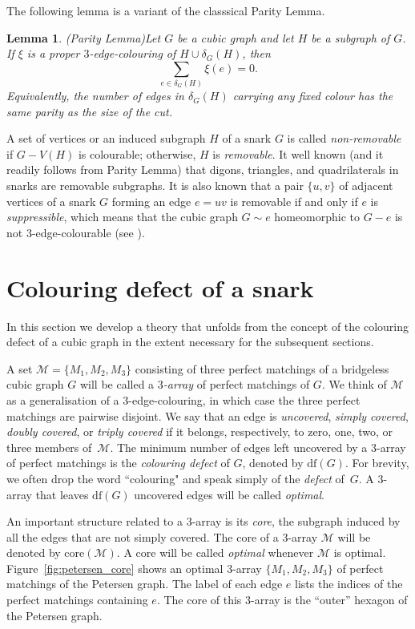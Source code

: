 \documentclass[a4paper]{amsart}
\newcommand{\df}[1]{\ensuremath{\mathrm{df}({#1})}\xspace}
\newcommand{\core}{{\mathrm{core}}}
\theoremstyle{plain}
\newtheorem{lemma}[theorem]{Lemma}
\theoremstyle{definition}
\begin{document}
The following lemma is a variant of the classsical Parity Lemma.

\begin{lemma}{\rm (Parity Lemma)}\label{lem:par}
Let $G$ be a cubic graph and let $H$ be a subgraph of $G$. If 
$\xi$ is a proper $3$-edge-colouring of $H\cup\delta_G(H)$, then
$$\sum_{e\in\delta_G(H)}\xi(e)=0.$$
Equivalently, the number of edges in $\delta_G(H)$ carrying any
fixed colour has the same parity as the size of the cut.
\end{lemma}

A set of vertices or an induced subgraph $H$ of a snark $G$ is
called \emph{non-removable} if $G - V(H)$ is colourable;
otherwise, $H$ is \emph{removable}. It well known (and it
readily follows from Parity Lemma) that digons, triangles, and
quadrilaterals in snarks are removable subgraphs. It is also
known that a pair $\{u,v\}$ of adjacent vertices of a snark $G$
forming an edge $e=uv$ is removable if and only if $e$ is
\emph{suppressible}, which means that the cubic graph $G\sim e$
homeomorphic to $G-e$ is not $3$-edge-colourable (see
\cite[Proposition~4.2]{NS-decred}).


\section{Colouring defect of a snark}\label{sec:arrays}

\noindent{}In this section we develop a theory that unfolds
from the concept of the colouring defect of a cubic graph in
the extent necessary for the subsequent sections.

A set $\mathcal{M}=\{M_1,M_2, M_3\}$ consisting of three
perfect matchings of a bridgeless cubic graph $G$ will be
called a \emph{$3$-array} of perfect matchings of $G$. We think
of $\mathcal{M}$ as a generalisation of a $3$-edge-colouring,
in which case the three perfect matchings are pairwise
disjoint. We say that an edge is \emph{uncovered}, \emph{simply
covered}, \emph{doubly covered}, or \emph{triply covered} if it
belongs, respectively, to zero, one, two, or three members
of~$\mathcal{M}$. The minimum number of edges left uncovered by
a $3$-array of perfect matchings is the \emph{colouring defect}
of $G$, denoted by $\df{G}$. For brevity, we often drop the
word ``colouring" and speak simply of the \emph{defect} of~$G$.
A $3$-array that leaves $\df{G}$ uncovered edges will be called
\emph{optimal}.

An important structure related to a $3$-array is its
\emph{core}, the subgraph induced by all the edges that
are not simply covered. The core of a $3$-array $\mathcal{M}$
will be denoted by $\core(\mathcal{M})$. A core will be called
\emph{optimal} whenever $\mathcal{M}$ is optimal.
Figure~\ref{fig:petersen_core} shows an optimal $3$-array
$\{M_1,M_2,M_3\}$ of perfect matchings of the Petersen graph.
The label of each edge $e$ lists the indices of the perfect
matchings containing  $e$. The core of this $3$-array is the
``outer'' hexagon of the Petersen graph.
\end{document}
